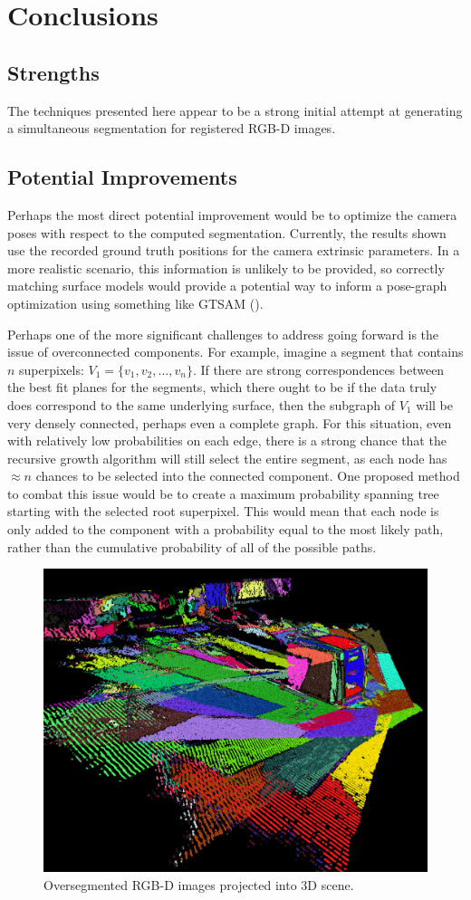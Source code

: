 \documentclass[10pt,letterpaper]{article}
\begin{document}
\section{Conclusions}
\subsection{Strengths}
	The techniques presented here appear to be a strong initial attempt at generating a simultaneous segmentation for registered RGB-D images. 
\subsection{Potential Improvements}

	Perhaps the most direct potential improvement would be to optimize the camera poses with respect to the computed segmentation. Currently, the results shown use the recorded ground truth positions for the camera extrinsic parameters. In a more realistic scenario, this information is unlikely to be provided, so correctly matching surface models would provide a potential way to inform a pose-graph optimization using something like GTSAM (\cite{gtsam}).
	
	Perhaps one of the more significant challenges to address going forward is the issue of overconnected components. For example, imagine a segment that contains $n$ superpixels: $V_1=\{v_1,v_2,\ldots,v_n\}$. If there are strong correspondences between the best fit planes for the segments, which there ought to be if the data truly does correspond to the same underlying surface, then the subgraph of $V_1$ will be very densely connected, perhaps even a complete graph. For this situation, even with relatively low probabilities on each edge, there is a strong chance that the recursive growth algorithm will still select the entire segment, as each node has $\approx n$ chances to be selected into the connected component. One proposed method to combat this issue would be to create a maximum probability spanning tree starting with the selected root superpixel. This would mean that each node is only added to the component with a probability equal to the most likely path, rather than the cumulative probability of all of the possible paths.




\begin{figure}[ht]
\begin{center}
	\includegraphics[width=.4\linewidth]{OverSegmented2.png}
\end{center}
\caption{Oversegmented RGB-D images projected into 3D scene.}
\label{fig:overseg2}
\end{figure}
\end{document}
